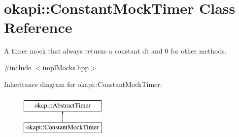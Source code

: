 \hypertarget{classokapi_1_1ConstantMockTimer}{}\section{okapi\+::Constant\+Mock\+Timer Class Reference}
\label{classokapi_1_1ConstantMockTimer}


A timer mock that always returns a constant dt and 0 for other methods.  




{\ttfamily \#include $<$impl\+Mocks.\+hpp$>$}

Inheritance diagram for okapi\+::Constant\+Mock\+Timer\+:\begin{figure}[H]
\begin{center}
\leavevmode
\includegraphics[height=2.000000cm]{classokapi_1_1ConstantMockTimer}
\end{center}
\end{figure}
